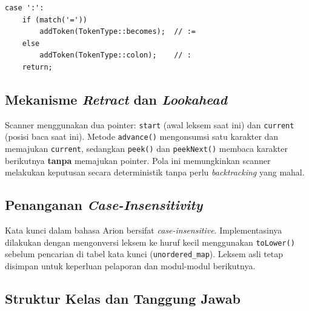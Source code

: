 \documentclass[12pt,a4paper]{article}
\begin{document}
\begin{lstlisting}[style=cpp, caption={Contoh lookahead untuk operator :=}]
case ':':
    if (match('='))
        addToken(TokenType::becomes);  // :=
    else
        addToken(TokenType::colon);    // :
    return;
\end{lstlisting}

\subsection{Mekanisme \textit{Retract} dan \textit{Lookahead}}
Scanner menggunakan dua pointer: \texttt{start} (awal leksem saat ini) dan \texttt{current} (posisi baca saat ini). Metode \texttt{advance()} mengonsumsi satu karakter dan memajukan \texttt{current}, sedangkan \texttt{peek()} dan \texttt{peekNext()} membaca karakter berikutnya \textbf{tanpa} memajukan pointer. Pola ini memungkinkan scanner melakukan keputusan secara deterministik tanpa perlu \textit{backtracking} yang mahal.

\subsection{Penanganan \textit{Case-Insensitivity}}
Kata kunci dalam bahasa Arion bersifat \textit{case-insensitive}. Implementasinya dilakukan dengan mengonversi leksem ke huruf kecil menggunakan \texttt{toLower()} sebelum pencarian di tabel kata kunci (\texttt{unordered\_map}). Leksem asli tetap disimpan untuk keperluan pelaporan dan modul-modul berikutnya.

\subsection{Struktur Kelas dan Tanggung Jawab}
\end{document}
